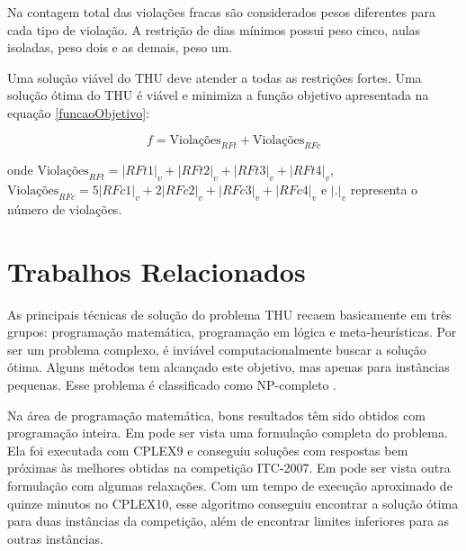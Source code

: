 \documentclass[11pt]{article}
\begin{document}
Na contagem total das violações fracas são considerados pesos diferentes para cada tipo de violação. A restrição de dias mínimos possui peso cinco, aulas isoladas, peso dois e as demais, peso um.

Uma solução viável do THU deve atender a todas as restrições fortes. Uma solução ótima do THU é viável e minimiza a função objetivo apresentada na equação \ref{funcaoObjetivo}:

\begin{equation}\label{funcaoObjetivo}
f = \text{Violações}_{RFt} + \text{Violações}_{RFc}
\end{equation}

\noindent onde $\text{Violações}_{RFt} = |RFt1|_v + |RFt2|_v + |RFt3|_v + |RFt4|_v$, $\text{Violações}_{RFc} = 5|RFc1|_v + 2|RFc2|_v + |RFc3|_v + |RFc4|_v$ e $|.|_v$ representa o número de violações.



\section{Trabalhos Relacionados}
\label{sec:trabalhos_relacionados}

As principais técnicas de solução do problema THU recaem basicamente em três grupos: programação matemática, programação em lógica e meta-heurísticas. Por ser um problema complexo, é inviável computacionalmente buscar a solução ótima. Alguns métodos tem alcançado este objetivo, mas apenas para instâncias pequenas. Esse problema é classificado como NP-completo \cite{Schaerf95asurvey}.

Na área de programação matemática, bons resultados têm sido obtidos com programação inteira. Em \cite{lach_lubbecke} pode ser vista uma formulação completa do problema. Ela foi executada com CPLEX9 e conseguiu soluções com respostas bem próximas às melhores obtidas na competição ITC-2007. Em \cite{Burke_abranch-andcut} pode ser vista outra formulação com algumas relaxações. Com um tempo de execução aproximado de quinze minutos no CPLEX10, esse algoritmo conseguiu encontrar a solução ótima para duas instâncias da competição, além de encontrar limites inferiores para as outras instâncias.
\end{document}
